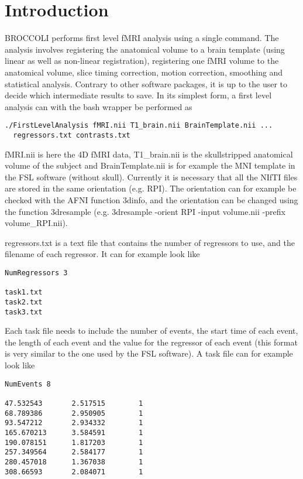 \section{Introduction}

BROCCOLI performs first level fMRI analysis using a single command. The analysis involves registering the anatomical volume to a brain template (using linear as well as non-linear registration), registering one fMRI volume to the anatomical volume, slice timing correction, motion correction, smoothing and statistical analysis. Contrary to other software packages, it is up to the user to decide which intermediate results to save. In its simplest form, a first level analysis can with the bash wrapper be performed as

\begin{verbatim}
./FirstLevelAnalysis fMRI.nii T1_brain.nii BrainTemplate.nii ... 
  regressors.txt contrasts.txt 
\end{verbatim}

fMRI.nii is here the 4D fMRI data, T1\_brain.nii is the skullstripped anatomical volume of the subject and BrainTemplate.nii is for example the MNI template in the FSL software (without skull). Currently it is necessary that all the NIfTI files are stored in the same orientation (e.g. RPI). The orientation can for example be checked with the AFNI function 3dinfo, and the orientation can be changed using the function 3dresample (e.g. 3dresample -orient RPI -input volume.nii -prefix volume\_RPI.nii).

regressors.txt is a text file that contains the number of regressors to use, and the filename of each regressor. It can for example look like

\begin{verbatim}
NumRegressors 3

task1.txt
task2.txt
task3.txt
\end{verbatim}

Each task file needs to include the number of events, the start time of each event, the length of each event and the value for the regressor of each event (this format is very similar to the one used by the FSL software). A task file can for example look like

\begin{verbatim}
NumEvents 8

47.532543       2.517515        1
68.789386       2.950905        1
93.547212       2.934332        1
165.670213      3.584591        1
190.078151      1.817203        1
257.349564      2.584177        1
280.457018      1.367038        1
308.66593       2.084071        1
\end{verbatim}

